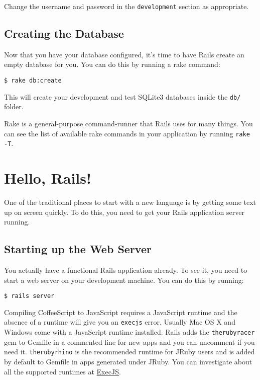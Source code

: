 \documentclass[10pt]{book}
\begin{document}
Change the username and password in the \texttt{development} section as appropriate.

\subsection{ Creating the Database}

Now that you have your database configured, it’s time to have Rails create an empty database for you. You can do this by running a rake command:

\begin{verbatim}
$ rake db:create
\end{verbatim}

This will create your development and test SQLite3 databases inside the \texttt{db/} folder.

Rake is a general-purpose command-runner that Rails uses for many things. You can see the list of available rake commands in your application by running \texttt{rake -T}.

\section{ Hello, Rails!}

One of the traditional places to start with a new language is by getting some text up on screen quickly. To do this, you need to get your Rails application server running.

\subsection{ Starting up the Web Server}

You actually have a functional Rails application already. To see it, you need to start a web server on your development machine. You can do this by running:

\begin{verbatim}
$ rails server
\end{verbatim}

Compiling CoffeeScript to JavaScript requires a JavaScript runtime and the absence of a runtime will give you an \texttt{execjs} error. Usually Mac OS X and Windows come with a JavaScript runtime installed. Rails adds the \texttt{therubyracer} gem to Gemfile in a commented line for new apps and you can uncomment if you need it. \texttt{therubyrhino} is the recommended runtime for JRuby users and is added by default to Gemfile in apps generated under JRuby. You can investigate about all the supported runtimes at \href{https://github.com/sstephenson/execjs#readme}{ExecJS}.
\end{document}

